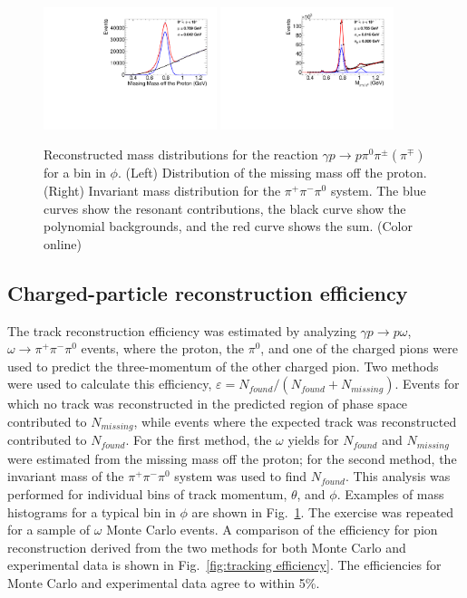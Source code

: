 \begin{figure}[tbp]
\begin{center}
\includegraphics[width=0.45\textwidth]{figures/MissingOmegaFit.pdf}
\includegraphics[width=0.45\textwidth]{figures/ThreePiFit.pdf}
\caption{\label{fig:omega mass}
Reconstructed mass distributions for the reaction $\gamma p \to p\pi^0\pi^{\pm}(\pi^\mp)$ for a bin in $\phi$.
  (Left) Distribution of the missing mass off the proton.
(Right) Invariant mass distribution for the $\pi^+\pi^-\pi^0$ system.  The blue curves show the resonant contributions, the black
curve show the polynomial backgrounds, and the red curve shows the sum.
 (Color online)}
\end{center}
\end{figure}


\subsection{Charged-particle reconstruction efficiency  \label{sec:trackeff}}  
The track reconstruction efficiency was estimated by analyzing $\gamma p \rightarrow p \omega$, $\omega\rightarrow\pi^+\pi^-\pi^0$ events, where the proton, the $\pi^0$, and one of the charged pions were used to predict the three-momentum of the other charged pion. Two methods were used to calculate this efficiency, $\varepsilon=N_{found}/(N_{found}+N_{missing})$.  Events for which no track was reconstructed in the predicted region of 
phase space contributed to $N_{missing}$, while events where the expected track was reconstructed contributed to $N_{found}$.  For the first method, the $\omega$ yields for $N_{found}$ and $N_{missing}$ were estimated from the missing mass off the 
proton; for the second method, the invariant mass of the $\pi^+\pi^-\pi^0$ system was used to find $N_{found}$.  This analysis was performed for individual bins of track momentum, $\theta$, and $\phi$.
Examples of mass histograms for a typical bin in $\phi$ are shown in Fig.~\ref{fig:omega mass}.  The exercise was repeated for a sample of $\omega$ Monte Carlo events.   A comparison of the efficiency for pion reconstruction derived from the 
two methods for both Monte Carlo and experimental data is shown in Fig.~\ref{fig:tracking efficiency}.  The efficiencies for Monte Carlo and experimental data 
agree to within 5\%.

